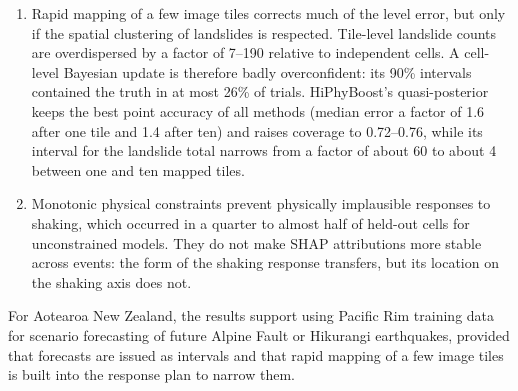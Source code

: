 \begin{enumerate}
\item Rapid mapping of a few image tiles corrects much of the level error, but only if the spatial clustering of landslides is respected. Tile-level landslide counts are overdispersed by a factor of 7--190 relative to independent cells. A cell-level Bayesian update is therefore badly overconfident: its 90\% intervals contained the truth in at most 26\% of trials. HiPhyBoost's quasi-posterior keeps the best point accuracy of all methods (median error a factor of 1.6 after one tile and 1.4 after ten) and raises coverage to 0.72--0.76, while its interval for the landslide total narrows from a factor of about 60 to about 4 between one and ten mapped tiles.
\item Monotonic physical constraints prevent physically implausible responses to shaking, which occurred in a quarter to almost half of held-out cells for unconstrained models. They do not make SHAP attributions more stable across events: the form of the shaking response transfers, but its location on the shaking axis does not.
\end{enumerate}
For Aotearoa New Zealand, the results support using Pacific Rim training data for scenario forecasting of future Alpine Fault or Hikurangi earthquakes, provided that forecasts are issued as intervals and that rapid mapping of a few image tiles is built into the response plan to narrow them.
